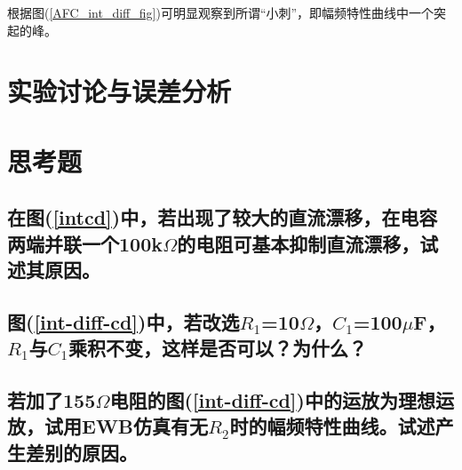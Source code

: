 \documentclass[a4paper]{article}
\begin{document}
根据图(\ref{AFC_int_diff_fig})可明显观察到所谓“小刺”，即幅频特性曲线中一个突起的峰。

\section{实验讨论与误差分析}

\section{思考题}
\subsection{在图(\ref{intcd})中，若出现了较大的直流漂移，在电容两端并联一个100k$\Omega$的电阻可基本抑制直流漂移，试述其原因。}
\subsection{图(\ref{int-diff-cd})中，若改选$R_1$=10$\Omega$，$C_1$=100$\mu$F，$R_1$与$C_1$乘积不变，这样是否可以？为什么？}
\subsection{若加了155$\Omega$电阻的图(\ref{int-diff-cd})中的运放为理想运放，试用EWB仿真有无$R_2$时的幅频特性曲线。试述产生差别的原因。}

\nocite{jiaocai}

\end{document}

